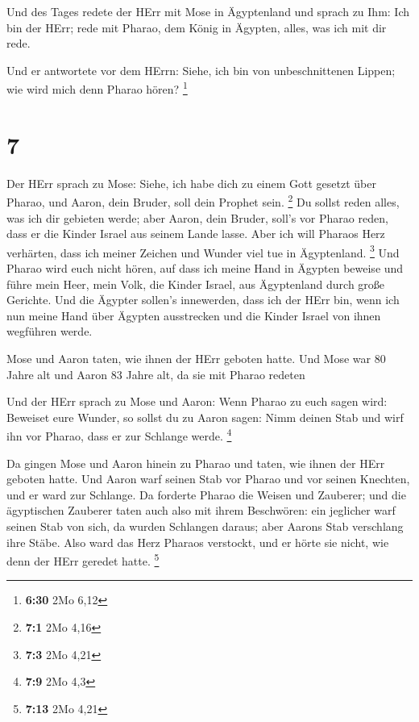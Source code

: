  Und des Tages redete der HErr mit Mose in Ägyptenland
 und sprach zu Ihm: Ich bin der HErr; rede mit Pharao, dem
König in Ägypten, alles, was ich mit dir rede.

 Und er antwortete vor dem HErrn: Siehe, ich bin von
unbeschnittenen Lippen; wie wird mich denn Pharao hören? \footnote{\textbf{6:30}
  2Mo 6,12}

\hypertarget{section-2}{%
\section{7}\label{section-2}}

 Der HErr sprach zu Mose: Siehe, ich habe dich zu einem Gott
gesetzt über Pharao, und Aaron, dein Bruder, soll dein Prophet sein.
\footnote{\textbf{7:1} 2Mo 4,16}  Du sollst reden alles, was
ich dir gebieten werde; aber Aaron, dein Bruder, soll's vor Pharao
reden, dass er die Kinder Israel aus seinem Lande lasse. 
Aber ich will Pharaos Herz verhärten, dass ich meiner Zeichen und Wunder
viel tue in Ägyptenland. \footnote{\textbf{7:3} 2Mo 4,21} 
Und Pharao wird euch nicht hören, auf dass ich meine Hand in Ägypten
beweise und führe mein Heer, mein Volk, die Kinder Israel, aus
Ägyptenland durch große Gerichte.  Und die Ägypter sollen's
innewerden, dass ich der HErr bin, wenn ich nun meine Hand über Ägypten
ausstrecken und die Kinder Israel von ihnen wegführen werde.

 Mose und Aaron taten, wie ihnen der HErr geboten hatte.
 Und Mose war 80 Jahre alt und Aaron 83 Jahre alt, da sie
mit Pharao redeten

 Und der HErr sprach zu Mose und Aaron:  Wenn
Pharao zu euch sagen wird: Beweiset eure Wunder, so sollst du zu Aaron
sagen: Nimm deinen Stab und wirf ihn vor Pharao, dass er zur Schlange
werde. \footnote{\textbf{7:9} 2Mo 4,3}

 Da gingen Mose und Aaron hinein zu Pharao und taten, wie
ihnen der HErr geboten hatte. Und Aaron warf seinen Stab vor Pharao und
vor seinen Knechten, und er ward zur Schlange.  Da forderte
Pharao die Weisen und Zauberer; und die ägyptischen Zauberer taten auch
also mit ihrem Beschwören:  ein jeglicher warf seinen Stab
von sich, da wurden Schlangen daraus; aber Aarons Stab verschlang ihre
Stäbe.  Also ward das Herz Pharaos verstockt, und er hörte
sie nicht, wie denn der HErr geredet hatte. \footnote{\textbf{7:13} 2Mo
  4,21}

